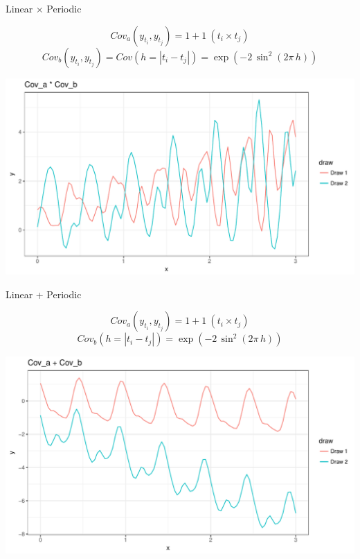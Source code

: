 \documentclass[11pt,ignorenonframetext,]{beamer}
\begin{document}
\begin{frame}[t]{Linear \(\times\) Periodic}

\vspace{-5mm} \[ Cov_a(y_{t_i}, y_{t_j}) = 1 + 1~(t_i \times t_j) \]
\[ Cov_b(y_{t_i}, y_{t_j}) = Cov(h = |t_i - t_j|) = \exp\left(-2\, \sin^2\left(2\pi\,h\right)\right) \]

\begin{center}\includegraphics{Lec14_files/figure-beamer/unnamed-chunk-17-1} \end{center}

\end{frame}

\begin{frame}[t]{Linear + Periodic}

\vspace{-5mm} \[ Cov_a(y_{t_i}, y_{t_j}) = 1 + 1~(t_i \times t_j) \]
\[ Cov_b(h = |t_i - t_j|) = \exp\left(-2\, \sin^2\left(2\pi\,h\right)\right) \]

\begin{center}\includegraphics{Lec14_files/figure-beamer/unnamed-chunk-18-1} \end{center}

\end{frame}
\end{document}
